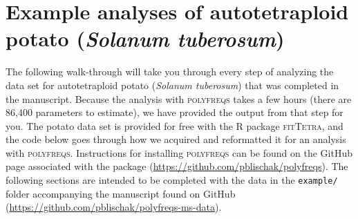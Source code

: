 \documentclass[]{article}
\title{}
\author{}
\date{}
\begin{document}
\section{\texorpdfstring{Example analyses of autotetraploid potato
(\emph{Solanum
tuberosum})}{Example analyses of autotetraploid potato (Solanum tuberosum)}}\label{example-analyses-of-autotetraploid-potato-solanum-tuberosum}

The following walk-through will take you through every step of analyzing
the data set for autotetraploid potato (\emph{Solanum tuberosum}) that
was completed in the manuscript. Because the analysis with
\textsc{polyfreqs} takes a few hours (there are 86,400 parameters to
estimate), we have provided the output from that step for you. The
potato data set is provided for free with the R package
\textsc{fitTetra}, and the code below goes through how we acquired and
reformatted it for an analysis with \textsc{polyfreqs}. Instructions for
installing \textsc{polyfreqs} can be found on the GitHub page associated
with the package (\url{https://github.com/pblischak/polyfreqs}). The
following sections are intended to be completed with the data in the
\texttt{example/} folder accompanying the manuscript found on GitHub
(\url{https://github.com/pblischak/polyfreqs-ms-data}).
\end{document}
